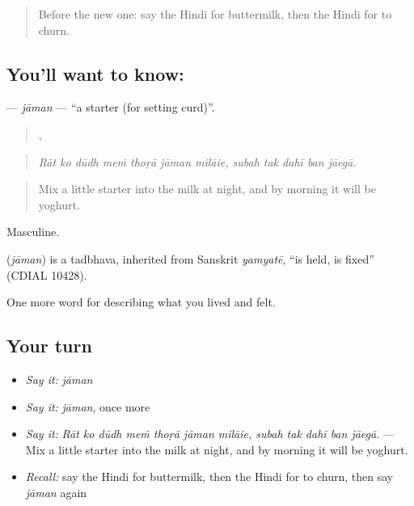 \label{lesson:HI-C522-jaman}



\begin{quote}
Before the new one: say the Hindi for buttermilk, then the Hindi for to churn.
\end{quote}

\subsection*{You'll want to know: }
\textbf{} — \emph{jāman} — \textquotedblleft{}a starter (for setting curd)\textquotedblright{}.

\begin{quote}
      ,     
\end{quote}

\begin{quote}
\emph{Rāt ko dūdh meṁ thoṛā jāman milāie, subah tak dahī ban jāegā.}
\end{quote}

\begin{quote}
Mix a little starter into the milk at night, and by morning it will be yoghurt.
\end{quote}

Masculine.

\begin{cousinweb}
\textbf{} (\emph{jāman}) is a tadbhava, inherited from Sanskrit \emph{yamyatē}, \textquotedblleft{}is held, is fixed\textquotedblright{} (CDIAL 10428).
\end{cousinweb}

\begin{grammarlens}[title={What you've built}]
One more word for describing what you lived and felt.
\end{grammarlens}

\subsection*{Your turn}
\begin{itemize}
\raggedright
  \item \emph{Say it:} \emph{jāman}
  \item \emph{Say it:} \emph{jāman}, once more
  \item \emph{Say it:} \emph{Rāt ko dūdh meṁ thoṛā jāman milāie, subah tak dahī ban jāegā.} — Mix a little starter into the milk at night, and by morning it will be yoghurt.
  \item \emph{Recall:} say the Hindi for buttermilk, then the Hindi for to churn, then say \emph{jāman} again
\end{itemize}

